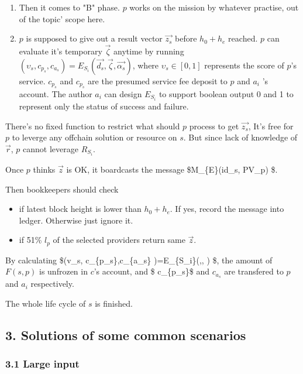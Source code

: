 \documentclass[11pt]{article}
\providecommand{\tightlist}{%
      \setlength{\itemsep}{0pt}\setlength{\parskip}{0pt}}
\begin{document}
\begin{enumerate}
\def\labelenumi{\arabic{enumi}.}
\setcounter{enumi}{3}
\item
  Then it comes to "B" phase. \(p\) works on the mission by whatever
  practise, out of the topic' scope here.
\item
  \(p\) is supposed to give out a result vector \(\vec{z_s}\) before
  \(h_0+h_e\) reached. \(p\) can evaluate it's temporary \(\vec{\zeta}\)
  anytime by running
  \(({\upsilon}_s, c_{p_s},c_{a_s} )= E_{S_i}(\vec{d_s},\vec{\zeta}, \vec{\alpha_s} )\),
  where \({\upsilon}_s \in [0,1]\) represents the score of \(p\)'s
  service. \(c_{p_s}\) and \(c_{p_s}\) are the presumed service fee
  deposit to \(p\) and \(a_i\) 's account. The author \(a_i\) can design
  \(E_{S_i}\) to support boolean output 0 and 1 to represent only the
  status of success and failure.
\end{enumerate}

There's no fixed function to restrict what should \(p\) process to get
\(\vec{z_s}\), It's free for \(p\) to leverge any offchain solution or
resource on \(s\). But since lack of knowledge of \(\vec{r}\), \(p\)
cannot leverage \(R_{S_i}\).

Once \(p\) thinks \(\vec{z}\) is OK, it boardcasts the message
\$M\_\{E\}(id\_s, \textbar{}PV\_p) \$.

Then bookkeepers should check

\begin{itemize}
\tightlist
\item
  if latest block height is lower than \(h_0+ h_e\). If yes, record the
  message into ledger. Otherwise just ignore it.
\item
  if 51\% \(l_{p}\) of the selected providers return same \(\vec{z}\).
\end{itemize}

By calculating \$(v\_s, c\_\{p\_s\},c\_\{a\_s\}
)=E\_\{S\_i\}(,,  ) \$, the amount of
\(F(s,p)\) is unfrozen in \(c\)'s account, and \$ c\_\{p\_s\}\$ and
\(c_{a_s}\) are transfered to \(p\) and \(a_i\) respectively.

The whole life cycle of \(s\) is finished.

\subsection{3. Solutions of some common
scenarios}\label{solutions-of-some-common-scenarios}

\subsubsection{3.1 Large input}\label{large-input}
\end{document}
